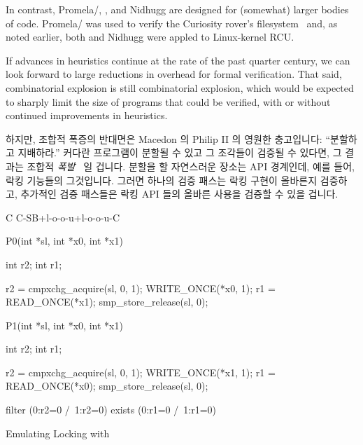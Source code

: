In contrast, Promela/, , and Nidhugg are designed for
(somewhat) larger bodies of code.
Promela/ was used to verify the Curiosity rover's
filesystem~\cite{DBLP:journals/amai/GroceHHJX14} and, as noted earlier,
both  and Nidhugg were appled to Linux-kernel RCU.

If advances in heuristics continue at the rate of the past quarter
century, we can look forward to large reductions in overhead for
formal verification.
That said, combinatorial explosion is still combinatorial explosion,
which would be expected to sharply limit the size of programs that
could be verified, with or without continued improvements in
heuristics.
\fi

하지만, 조합적 폭증의 반대면은 Macedon 의 Philip II 의 영원한 충고입니다:
``분할하고 지배하라.''
커다란 프로그램이 분할될 수 있고 그 조각들이 검증될 수 있다면, 그 결과는 조합적
\emph{폭발}~\cite{PaulEMcKenney2011Verico} 일 겁니다.
분할을 할 자연스러운 장소는 API 경계인데, 예를 들어, 락킹 기능들의 그것입니다.
그러면 하나의 검증 패스는 락킹 구현이 올바른지 검증하고, 추가적인 검증 패스들은
락킹 API 들의 올바른 사용을 검증할 수 있을 겁니다.
\iffalse

However, the flip side of combinatorial explosion is Philip II of
Macedon's timeless advice: ``Divide and rule.''
If a large program can be divided and the pieces verified, the result
can be combinatorial \emph{implosion}~\cite{PaulEMcKenney2011Verico}.
One natural place to divide is on API boundaries, for example, those
of locking primitives.
One verification pass can then verify that the locking implementation
is correct, and additional verification passes can verify correct
use of the locking APIs.
\fi

\begin{listing}[tbp]
{ \scriptsize
\begin{verbbox}[\LstLineNo]
C C-SB+l-o-o-u+l-o-o-u-C

{
}

P0(int *sl, int *x0, int *x1)
{
  int r2;
  int r1;

  r2 = cmpxchg_acquire(sl, 0, 1);
  WRITE_ONCE(*x0, 1);
  r1 = READ_ONCE(*x1);
  smp_store_release(sl, 0);
}

P1(int *sl, int *x0, int *x1)
{
  int r2;
  int r1;

  r2 = cmpxchg_acquire(sl, 0, 1);
  WRITE_ONCE(*x1, 1);
  r1 = READ_ONCE(*x0);
  smp_store_release(sl, 0);
}

filter (0:r2=0 /\ 1:r2=0)
exists (0:r1=0 /\ 1:r1=0)
\end{verbbox}
}
\centering
\theverbbox
\caption{Emulating Locking with }
\label{lst:future:Emulating Locking with cmpxchg}
\end{listing}

